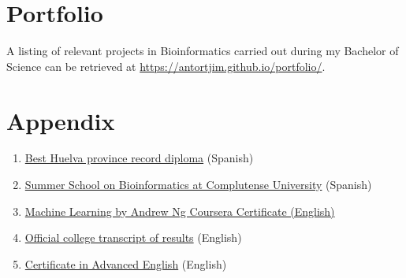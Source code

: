 \documentclass[paper=a4,fontsize=11pt]{article} %
\newcommand{\NewPart}[1]{\section*{
									{#1}}}
\begin{document}
\NewPart{Portfolio}

A listing of relevant projects in Bioinformatics carried out during my Bachelor of Science can be retrieved at \href{https://antortjim.github.io/portfolio/}{https://antortjim.github.io/portfolio/}.



\NewPart{Appendix}
\begin{enumerate}


\item \hyperlink{premio_extraordinario}{Best Huelva province record diploma} (Spanish)
\item \hyperlink{complu}{Summer School on Bioinformatics at Complutense University} (Spanish)

\item \hyperlink{ML-Coursera}{Machine Learning by Andrew Ng Coursera Certificate (English)}

\item \hyperlink{exp-en}{Official college transcript of results} (English)
\item \hyperlink{cae}{Certificate in Advanced English} (English)
\end{enumerate}
%



\end{document}

